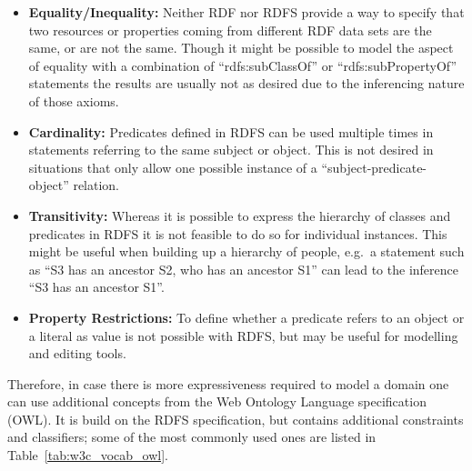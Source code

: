 \begin{itemize}
	\item \textbf{Equality/Inequality:} Neither \gls{RDF} nor \gls{RDFS} provide a way to specify that two resources or properties coming from different \gls{RDF} data sets are the same, or are not the same. Though it might be possible to model the aspect of equality with a combination of ``rdfs:subClassOf'' or ``rdfs:subPropertyOf'' statements the results are usually not as desired due to the inferencing nature of those axioms.
	\item \textbf{Cardinality:} Predicates defined in \gls{RDFS} can be used multiple times in statements referring to the same subject or object. This is not desired in situations that only allow one possible instance of a ``subject-predicate-object'' relation.
	\item \textbf{Transitivity:} Whereas it is possible to express the hierarchy of classes and predicates in \gls{RDFS} it is not feasible to do so for individual instances. This might be useful when building up a hierarchy of people, e.g.\ a statement such as ``S3 has an ancestor S2, who has an ancestor S1'' can lead to the inference ``S3 has an ancestor S1''.
	\item \textbf{Property Restrictions:} To define whether a predicate refers to an object or a literal as value is not possible with \gls{RDFS}, but may be useful for modelling and editing tools.
\end{itemize}

Therefore, in case there is more expressiveness required to model a domain one can use additional concepts from the Web Ontology Language specification (\gls{OWL}). It is build on the \gls{RDFS} specification, but contains additional constraints and classifiers; some of the most commonly used ones are listed in Table~\ref{tab:w3c_vocab_owl}. \@

